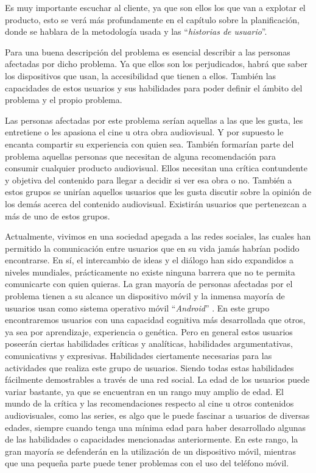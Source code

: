 Es muy importante escuchar al cliente, ya que son ellos los que van a explotar el producto, esto se 
verá más profundamente en el capítulo sobre la planificación, donde se hablara de la metodología usada 
y las ``\textit{historias de usuario}''.

Para una buena descripción del problema es esencial describir a las personas afectadas por dicho 
problema. Ya que ellos son los perjudicados, habrá que saber los dispositivos que usan, la 
accesibilidad que tienen a ellos. También las capacidades de estos usuarios y sus habilidades para 
poder definir el ámbito del problema y el propio problema.

Las personas afectadas por este problema serían aquellas a las que les gusta, les entretiene o les 
apasiona el cine u otra obra audiovisual. Y por supuesto le encanta compartir su experiencia con quien 
sea. También formarían parte del problema aquellas personas que necesitan de alguna recomendación para 
consumir cualquier producto audiovisual. Ellos necesitan una crítica contundente y objetiva del 
contenido para llegar a decidir si ver esa obra o no. También a estos grupos se unirían aquellos 
usuarios que les gusta discutir sobre la opinión de los demás acerca del contenido audiovisual. 
Existirán usuarios que pertenezcan a más de uno de estos grupos. 

Actualmente, vivimos en una sociedad apegada a las redes sociales, las cuales han permitido la 
comunicación entre usuarios que en su vida jamás habrían podido encontrarse. En sí, el intercambio de 
ideas y el diálogo han sido expandidos a niveles mundiales, prácticamente no existe ninguna barrera
que no te permita comunicarte con quien quieras. La gran mayoría de personas afectadas por el problema 
tienen a su alcance un dispositivo móvil y la inmensa mayoría de usuarios usan como sistema operativo 
móvil ``\textit{Android}'' \cite{AndrvsIOS}. En este grupo encontraremos usuarios con una capacidad 
cognitiva más desarrollada que otros, ya sea por aprendizaje, experiencia o genética. Pero en general 
estos usuarios poseerán ciertas habilidades críticas y analíticas, habilidades argumentativas, 
comunicativas y expresivas. Habilidades ciertamente necesarias para las actividades que realiza este 
grupo de usuarios. Siendo todas estas habilidades fácilmente demostrables a través de  una red social. 
La edad de los usuarios puede variar bastante, ya que se encuentran en un rango muy amplio de edad. El 
mundo de la crítica y las recomendaciones respecto al cine u otros contenidos audiovisuales, como las 
series, es algo que le puede fascinar a usuarios de diversas edades, siempre cuando tenga una mínima 
edad para haber desarrollado algunas de las habilidades o capacidades mencionadas anteriormente. En
este rango, la gran mayoría se defenderán en la utilización de un dispositivo móvil, mientras que una 
pequeña parte puede tener problemas con el uso del teléfono móvil.

